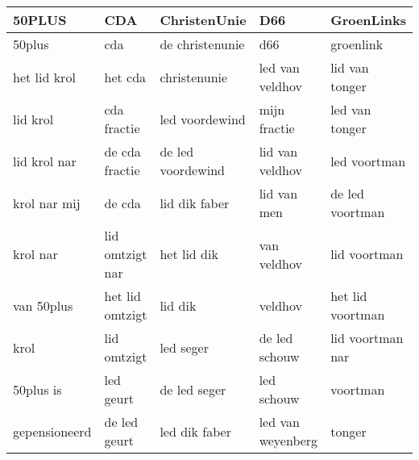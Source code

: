 \begin{tabular}{lllll}
\toprule
        50PLUS &              CDA &       ChristenUnie &                D66 &        GroenLinks \\
\midrule
        50plus &              cda &    de christenunie &                d66 &         groenlink \\
  het lid krol &          het cda &       christenunie &    led van veldhov &    lid van tonger \\
      lid krol &      cda fractie &     led voordewind &       mijn fractie &    led van tonger \\
  lid krol nar &   de cda fractie &  de led voordewind &    lid van veldhov &      led voortman \\
  krol nar mij &           de cda &      lid dik faber &        lid van men &   de led voortman \\
      krol nar &  lid omtzigt nar &        het lid dik &        van veldhov &      lid voortman \\
    van 50plus &  het lid omtzigt &            lid dik &            veldhov &  het lid voortman \\
          krol &      lid omtzigt &          led seger &      de led schouw &  lid voortman nar \\
     50plus is &        led geurt &       de led seger &         led schouw &          voortman \\
 gepensioneerd &     de led geurt &      led dik faber &  led van weyenberg &            tonger \\
\bottomrule
\end{tabular}
